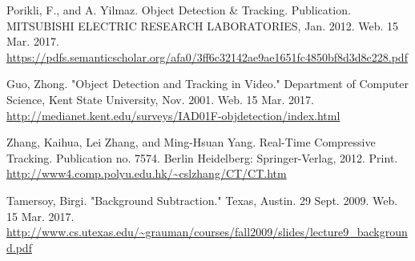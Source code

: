 \documentclass[11pt,letterpaper]{article}
\begin{document}
	
	\newpage
	\begin{thebibliography}{9}
		
		Porikli, F., and A. Yilmaz. Object Detection \& Tracking. Publication. MITSUBISHI ELECTRIC RESEARCH LABORATORIES, Jan. 2012. Web. 15 Mar. 2017.\\ \url{https://pdfs.semanticscholar.org/afa0/3ff6c32142ae9ae1651fc4850bf8d3d8c228.pdf}
		
		Guo, Zhong. "Object Detection and Tracking in Video." Department of Computer Science, Kent State University, Nov. 2001. Web. 15 Mar. 2017.\\ \url{http://medianet.kent.edu/surveys/IAD01F-objdetection/index.html}
		
		Zhang, Kaihua, Lei Zhang, and Ming-Hsuan Yang. Real-Time Compressive Tracking. Publication no. 7574. Berlin Heidelberg: Springer-Verlag, 2012. Print.\\
		\url{http://www4.comp.polyu.edu.hk/~cslzhang/CT/CT.htm}
		
		Tamersoy, Birgi. "Background Subtraction." Texas, Austin. 29 Sept. 2009. Web. 15 Mar. 2017.\\ \url{http://www.cs.utexas.edu/~grauman/courses/fall2009/slides/lecture9\_background.pdf}
	\end{thebibliography}
	
	
\end{document}
